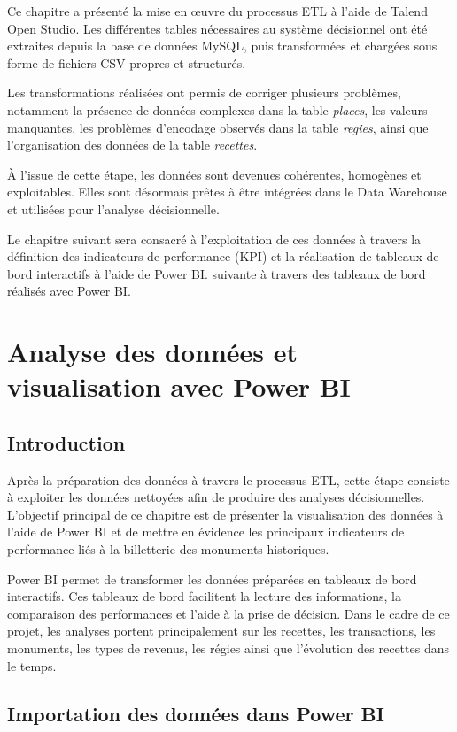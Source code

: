 \documentclass[12pt,a4paper]{report}
\begin{document}
Ce chapitre a présenté la mise en œuvre du processus ETL à l’aide de Talend Open Studio. Les différentes tables nécessaires au système décisionnel ont été extraites depuis la base de données MySQL, puis transformées et chargées sous forme de fichiers CSV propres et structurés.

Les transformations réalisées ont permis de corriger plusieurs problèmes, notamment la présence de données complexes dans la table \textit{places}, les valeurs manquantes, les problèmes d’encodage observés dans la table \textit{regies}, ainsi que l’organisation des données de la table \textit{recettes}.

À l’issue de cette étape, les données sont devenues cohérentes, homogènes et exploitables. Elles sont désormais prêtes à être intégrées dans le Data Warehouse et utilisées pour l’analyse décisionnelle.

Le chapitre suivant sera consacré à l’exploitation de ces données à travers la définition des indicateurs de performance (KPI) et la réalisation de tableaux de bord interactifs à l’aide de Power BI. suivante à travers des tableaux de bord réalisés avec Power BI.
\chapter{Analyse des données et visualisation avec Power BI}

\section*{Introduction}

Après la préparation des données à travers le processus ETL, cette étape consiste à exploiter les données nettoyées afin de produire des analyses décisionnelles. L’objectif principal de ce chapitre est de présenter la visualisation des données à l’aide de Power BI et de mettre en évidence les principaux indicateurs de performance liés à la billetterie des monuments historiques.

Power BI permet de transformer les données préparées en tableaux de bord interactifs. Ces tableaux de bord facilitent la lecture des informations, la comparaison des performances et l’aide à la prise de décision. Dans le cadre de ce projet, les analyses portent principalement sur les recettes, les transactions, les monuments, les types de revenus, les régies ainsi que l’évolution des recettes dans le temps.

\section{Importation des données dans Power BI}
\end{document}
